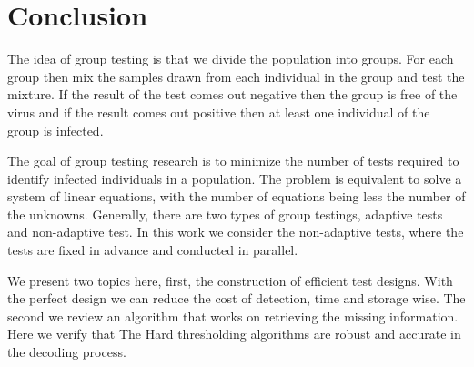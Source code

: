 \chapter*{Conclusion}

The idea of group testing is that we divide the population into groups. For each group then mix the samples drawn from each individual in the group and test the mixture. If the result of the test comes out negative then the group is free of the virus and if the result comes out positive then at least one individual of the group is infected. 


The goal of group testing research is to minimize the number of tests required to identify infected individuals in a population.  The problem is equivalent to solve a system of linear equations, with the number of equations being less the number of the unknowns.  Generally, there are two types of group testings, adaptive tests and non-adaptive test. In this work we consider the non-adaptive tests, where the tests are fixed in advance and conducted in parallel.


We present two topics here, first, the construction of efficient test designs. With the perfect design we can reduce the cost of detection, time and storage wise.  The second we review an algorithm that works on retrieving the missing information.  Here we verify that The Hard thresholding algorithms are robust and accurate in the decoding process.  
